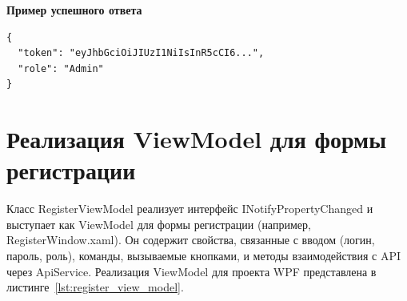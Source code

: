 \documentclass[12pt]{article}
\renewcommand{\texttt}[1]{{\small\ttfamily #1}}
\numberwithin{listing}{section}
\numberwithin{figure}{section}
\begin{document}
\noindent \textbf{Пример успешного ответа}
\begin{verbatim}
{
  "token": "eyJhbGciOiJIUzI1NiIsInR5cCI6...",
  "role": "Admin"
}
\end{verbatim}

\newpage

\section{Реализация ViewModel для формы регистрации}
Класс \texttt{RegisterViewModel} реализует интерфейс \texttt{INotifyPropertyChanged} и выступает как ViewModel для формы регистрации (например, \texttt{RegisterWindow.xaml}).
Он содержит свойства, связанные с вводом (логин, пароль, роль), команды, вызываемые кнопками, и методы взаимодействия с API через \texttt{ApiService}.
Реализация ViewModel для проекта WPF представлена в листинге~\ref{lst:register_view_model}.
\end{document}
